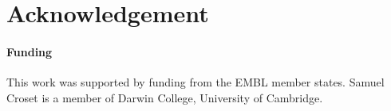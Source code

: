 \documentclass{bioinfo}
\begin{document}
\section*{Acknowledgement}
\paragraph{Funding\textcolon}
This work was supported by funding from the EMBL member states. Samuel Croset is a member of Darwin College, University of Cambridge.









 

\end{document}
